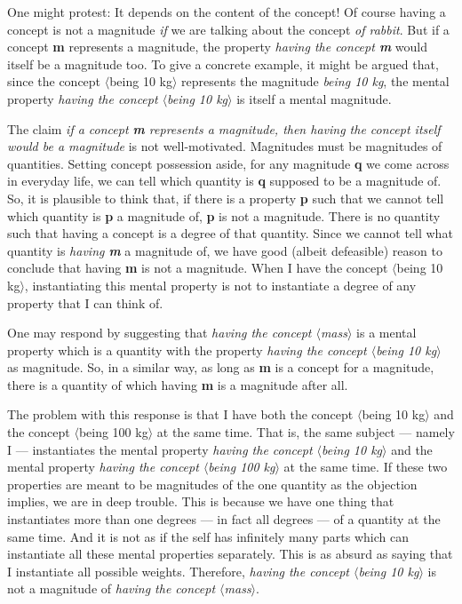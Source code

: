 \documentclass[a4paper,12pt]{article}
\begin{document}
One might protest: It depends on the content of the concept! Of course having a concept is not a magnitude \emph{if} we are talking about the concept \emph{of rabbit}. But if a concept \textbf{m} represents a magnitude, the property \emph{having the concept \textbf{m}} would itself be a magnitude too. To give a concrete example, it might be argued that, since the concept $\langle$being 10 kg$\rangle$ represents the magnitude \emph{being 10 kg}, the mental property \emph{having the concept $\langle$being 10 kg$\rangle$} is itself a mental magnitude.

The claim \emph{if a concept \textbf{m} represents a magnitude, then having the concept itself would be a magnitude} is not well-motivated. Magnitudes must be magnitudes of quantities. Setting concept possession aside, for any magnitude \textbf{q} we come across in everyday life, we can tell which quantity is \textbf{q} supposed to be a magnitude of. So, it is plausible to think that, if there is a property \textbf{p} such that we cannot tell which quantity is \textbf{p} a magnitude of, \textbf{p} is not a magnitude. There is no quantity such that having a concept is a degree of that quantity. Since we cannot tell what quantity is \emph{having \textbf{m}} a magnitude of, we have good (albeit defeasible) reason to conclude that having \textbf{m} is not a magnitude. When I have the concept $\langle$being 10 kg$\rangle$, instantiating this mental property is not to instantiate a degree of any property that I can think of.

One may respond by suggesting that \emph{having the concept $\langle$mass$\rangle$} is a mental property which is a quantity with the property \emph{having the concept $\langle$being 10 kg$\rangle$} as magnitude. So, in a similar way, as long as \textbf{m} is a concept for a magnitude, there is a quantity of which having \textbf{m} is a magnitude after all.

The problem with this response is that I have both the concept $\langle$being 10 kg$\rangle$ and the concept $\langle$being 100 kg$\rangle$ at the same time. That is, the same subject --- namely I --- instantiates the mental property \emph{having the concept $\langle$being 10 kg$\rangle$} and the mental property \emph{having the concept $\langle$being 100 kg$\rangle$} at the same time. If these two properties are meant to be magnitudes of the one quantity as the objection implies, we are in deep trouble. This is because we have one thing that instantiates more than one degrees --- in fact all degrees --- of a quantity at the same time. And it is not as if the self has infinitely many parts which can instantiate all these mental properties separately. This is as absurd as saying that I instantiate all possible weights. Therefore, \emph{having the concept $\langle$being 10 kg$\rangle$} is not a magnitude of \emph{having the concept $\langle$mass$\rangle$}.
\end{document}
